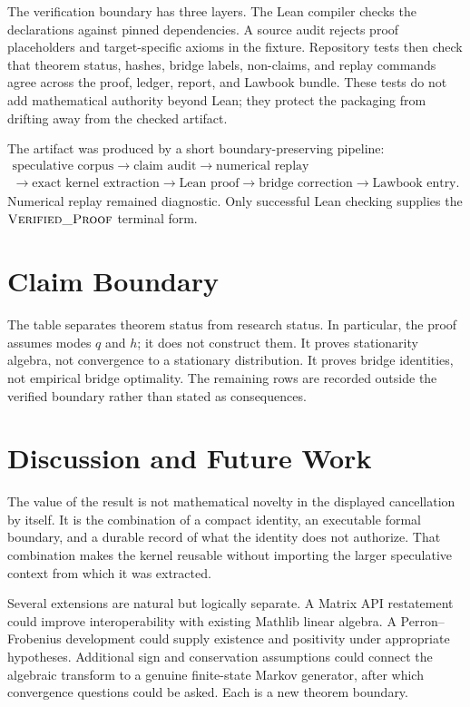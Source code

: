 \documentclass[10pt]{article}
\newcommand{\verified}{\textsc{Verified\_Proof}}
\begin{document}
The verification boundary has three layers. The Lean compiler checks the
declarations against pinned dependencies. A source audit rejects proof
placeholders and target-specific axioms in the fixture. Repository tests then
check that theorem status, hashes, bridge labels, non-claims, and replay
commands agree across the proof, ledger, report, and Lawbook bundle. These
tests do not add mathematical authority beyond Lean; they protect the
packaging from drifting away from the checked artifact.

The artifact was produced by a short boundary-preserving pipeline:
\[
\begin{gathered}
\text{speculative corpus}\to\text{claim audit}\to\text{numerical replay}\\
\to\text{exact kernel extraction}\to\text{Lean proof}
\to\text{bridge correction}\to\text{Lawbook entry}.
\end{gathered}
\]
Numerical replay remained diagnostic. Only successful Lean checking supplies
the \(\verified\) terminal form.

\section{Claim Boundary}



The table separates theorem status from research status. In particular, the
proof assumes modes \(q\) and \(h\); it does not construct them. It proves
stationarity algebra, not convergence to a stationary distribution. It proves
bridge identities, not empirical bridge optimality. The remaining rows are
recorded outside the verified boundary rather than stated as consequences.

\section{Discussion and Future Work}

The value of the result is not mathematical novelty in the displayed
cancellation by itself. It is the combination of a compact identity, an
executable formal boundary, and a durable record of what the identity does not
authorize. That combination makes the kernel reusable without importing the
larger speculative context from which it was extracted.

Several extensions are natural but logically separate. A Matrix API
restatement could improve interoperability with existing Mathlib linear
algebra. A Perron--Frobenius development could supply existence and positivity
under appropriate hypotheses. Additional sign and conservation assumptions
could connect the algebraic transform to a genuine finite-state Markov
generator, after which convergence questions could be asked. Each is a new
theorem boundary.
\end{document}
